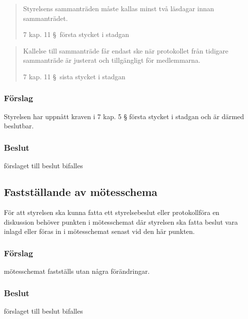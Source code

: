 \documentclass[protokoll]{dvd}
\begin{document}
\blockquote[7 kap. 11 \S~första stycket i stadgan]{
Styrelsens sammanträden måste kallas minst två läsdagar innan sammanträdet.}

\blockquote[7 kap. 11 \S~sista stycket i stadgan]{
Kallelse till sammanträde får endast ske när protokollet från tidigare sammanträde är justerat och tillgängligt för medlemmarna.}

\subsubsection*{Förslag}

\begin{attsatser}
    \item Styrelsen har uppnått kraven i 7 kap. 5 § första stycket i stadgan och är därmed beslutbar.
\end{attsatser}
\subsubsection*{Beslut}
\begin{attsatser}
    \item förslaget till beslut bifalles
\end{attsatser}


\subsection{Fastställande av mötesschema}
För att styrelsen ska kunna fatta ett styrelsebeslut eller protokollföra en diskussion behöver punkten i mötesschemat där styrelsen ska fatta beslut vara inlagd eller föras in i mötesschemat senast vid den här punkten.

\subsubsection*{Förslag}

\begin{attsatser}
    \item 
    mötesschemat fastställs utan några förändringar.
\end{attsatser}
\subsubsection*{Beslut}
\begin{attsatser}
    \item förslaget till beslut bifalles
\end{attsatser}
\end{document}
